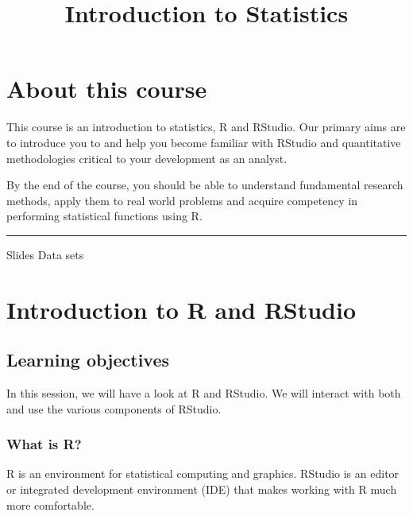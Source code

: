 \documentclass[]{article}
\title{Introduction to Statistics}
\author{}
\date{}
\begin{document}
\maketitle

{
\setcounter{tocdepth}{2}
\tableofcontents
}
\hypertarget{about-this-course}{%
\section*{About this course}\label{about-this-course}}

This course is an introduction to statistics, R and RStudio. Our primary aims are to introduce you to and help you become familiar with RStudio and quantitative methodologies critical to your development as an analyst.

By the end of the course, you should be able to understand fundamental research methods, apply them to real world problems and acquire competency in performing statistical functions using R.

\begin{center}\rule{0.5\linewidth}{\linethickness}\end{center}

Slides
Data sets

\hypertarget{introduction-to-r-and-rstudio}{%
\section{Introduction to R and RStudio}\label{introduction-to-r-and-rstudio}}

\hypertarget{learning-objectives}{%
\subsection{Learning objectives}\label{learning-objectives}}

In this session, we will have a look at R and RStudio. We will interact with both and use the various components of RStudio.

\hypertarget{what-is-r}{%
\subsubsection{What is R?}\label{what-is-r}}

R is an environment for statistical computing and graphics. RStudio is an editor or integrated development environment (IDE) that makes working with R much more comfortable.
\end{document}
